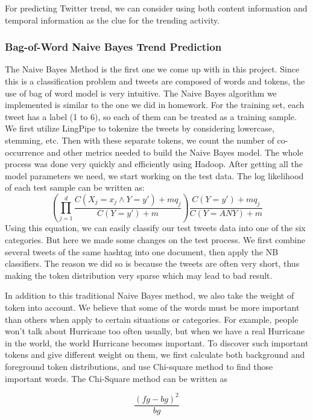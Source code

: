 \documentclass{article}
\begin{document}
For predicting Twitter trend, we can consider using both content information and temporal information as the clue for the trending activity.   

\subsubsection{Bag-of-Word Naive Bayes Trend Prediction}
The Naive Bayes Method is the first one we come up with in this project. Since this is a classification problem and tweets are composed of words and tokens, the use of bag of word model is very intuitive. The Naive Bayes algorithm we implemented is similar to the one we did in homework. For the training set, each tweet has a label (1 to 6), so each of them can be treated as a training sample. We first utilize LingPipe to tokenize the tweets by considering lowercase, stemming, etc. Then with these separate tokens, we count the number of co-occurrence and other metrics needed to build the Naive Bayes model. The whole process was done very quickly and efficiently using Hadoop.
After getting all the model parameters we need, we start working on the test data. The log likelihood of each test sample can be written as:
\begin{equation} 
(\prod_{j=1}^d  \frac{C(X_j=x_j \wedge Y=y')+mq_j}{C(Y=y')+m})\frac{C(Y=y')+mq_j}{C(Y=ANY)+m}
\end{equation}
Using this equation, we can easily classify our test tweets data into one of the six categories. But here we made some changes on the test process. We first combine several tweets of the same hashtag into one document, then apply the NB classifiers. The reason we did so is because the tweets are often very short, thus making the token distribution very sparse which may lead to bad result. 

In addition to this traditional Naive Bayes method, we also take the weight of token into account. We believe that some of the words must be more important than others when apply to certain situations or categories. For example, people won't talk about Hurricane too often usually, but when we have a real Hurricane in the world, the world Hurricane becomes important. To discover such important tokens and give different weight on them, we first calculate both background and foreground token distributions, and use Chi-square method to find those important words. The Chi-Square method can be written as

\begin{equation} 
\frac{(fg-bg)^2}{bg}
\end{equation}
\end{document}
